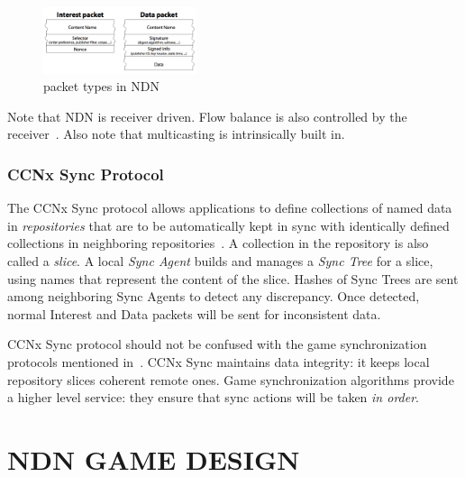 \documentclass{sigchi}
\begin{document}
\begin{figure} 
\begin{center}
\includegraphics[width=0.4\textwidth] {image/packet_types}
\caption{packet types in NDN}
\label{packet_types}
\end{center}
\end{figure}

Note that NDN is receiver driven. Flow balance is also controlled by the receiver~\cite{Zact}. Also note that multicasting is intrinsically built in.

\subsubsection{CCNx Sync Protocol}
\label{ccnsync}

The CCNx Sync protocol allows applications to define collections of named data in \emph{repositories} that are to be automatically kept in sync with identically defined collections in neighboring repositories~\cite{CCNxSync}. A collection in the repository is also called a \emph{slice}. A local \emph{Sync Agent} builds and manages a \emph{Sync Tree} for a slice, using names that represent the content of the slice. Hashes of Sync Trees are sent among neighboring Sync Agents to detect any discrepancy. Once detected, normal Interest and Data packets will be sent for inconsistent data.

CCNx Sync protocol should not be confused with the game synchronization protocols mentioned in~. CCNx Sync maintains data integrity: it keeps local repository slices coherent remote ones. Game synchronization algorithms provide a higher level service: they ensure that sync actions will be taken \emph{in order}.




\section{NDN GAME DESIGN}
\label{gamedesign}
\end{document}
